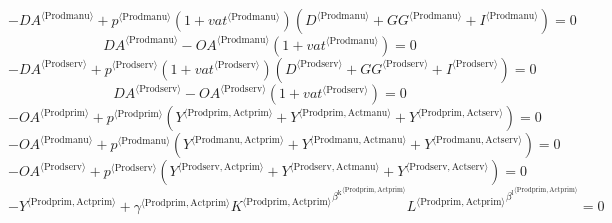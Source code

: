 \begin{equation}
-{{D\!A}}^{\langle \mathrm{Prodmanu}\rangle} + {{p}^{\langle \mathrm{Prodmanu}\rangle}} \left(1 + {{v\!a\!t}}^{\langle \mathrm{\mathrm{Prodmanu}}\rangle}\right) \left({D}^{\langle \mathrm{Prodmanu}\rangle} + {{G\!G}}^{\langle \mathrm{Prodmanu}\rangle} + {I}^{\langle \mathrm{Prodmanu}\rangle}\right) = 0
\end{equation}
\begin{equation}
{{D\!A}}^{\langle \mathrm{Prodmanu}\rangle} - {{{O\!A}}^{\langle \mathrm{Prodmanu}\rangle}} \left(1 + {{v\!a\!t}}^{\langle \mathrm{\mathrm{Prodmanu}}\rangle}\right) = 0
\end{equation}
\begin{equation}
-{{D\!A}}^{\langle \mathrm{Prodserv}\rangle} + {{p}^{\langle \mathrm{Prodserv}\rangle}} \left(1 + {{v\!a\!t}}^{\langle \mathrm{\mathrm{Prodserv}}\rangle}\right) \left({D}^{\langle \mathrm{Prodserv}\rangle} + {{G\!G}}^{\langle \mathrm{Prodserv}\rangle} + {I}^{\langle \mathrm{Prodserv}\rangle}\right) = 0
\end{equation}
\begin{equation}
{{D\!A}}^{\langle \mathrm{Prodserv}\rangle} - {{{O\!A}}^{\langle \mathrm{Prodserv}\rangle}} \left(1 + {{v\!a\!t}}^{\langle \mathrm{\mathrm{Prodserv}}\rangle}\right) = 0
\end{equation}
\begin{equation}
-{{O\!A}}^{\langle \mathrm{Prodprim}\rangle} + {{p}^{\langle \mathrm{Prodprim}\rangle}} \left({Y}^{\langle \mathrm{Prodprim},\mathrm{Actprim}\rangle} + {Y}^{\langle \mathrm{Prodprim},\mathrm{Actmanu}\rangle} + {Y}^{\langle \mathrm{Prodprim},\mathrm{Actserv}\rangle}\right) = 0
\end{equation}
\begin{equation}
-{{O\!A}}^{\langle \mathrm{Prodmanu}\rangle} + {{p}^{\langle \mathrm{Prodmanu}\rangle}} \left({Y}^{\langle \mathrm{Prodmanu},\mathrm{Actprim}\rangle} + {Y}^{\langle \mathrm{Prodmanu},\mathrm{Actmanu}\rangle} + {Y}^{\langle \mathrm{Prodmanu},\mathrm{Actserv}\rangle}\right) = 0
\end{equation}
\begin{equation}
-{{O\!A}}^{\langle \mathrm{Prodserv}\rangle} + {{p}^{\langle \mathrm{Prodserv}\rangle}} \left({Y}^{\langle \mathrm{Prodserv},\mathrm{Actprim}\rangle} + {Y}^{\langle \mathrm{Prodserv},\mathrm{Actmanu}\rangle} + {Y}^{\langle \mathrm{Prodserv},\mathrm{Actserv}\rangle}\right) = 0
\end{equation}
\begin{equation}
-{Y}^{\langle \mathrm{Prodprim},\mathrm{Actprim}\rangle} + {{\gamma}^{\langle \mathrm{\mathrm{Prodprim}},\mathrm{\mathrm{Actprim}}\rangle}} {{{K}^{\langle \mathrm{Prodprim},\mathrm{Actprim}\rangle}}^{{\beta^{\mathrm{k}}}^{\langle \mathrm{\mathrm{Prodprim}},\mathrm{\mathrm{Actprim}}\rangle}}} {{{L}^{\langle \mathrm{Prodprim},\mathrm{Actprim}\rangle}}^{{\beta^{\mathrm{l}}}^{\langle \mathrm{\mathrm{Prodprim}},\mathrm{\mathrm{Actprim}}\rangle}}} = 0
\end{equation}
